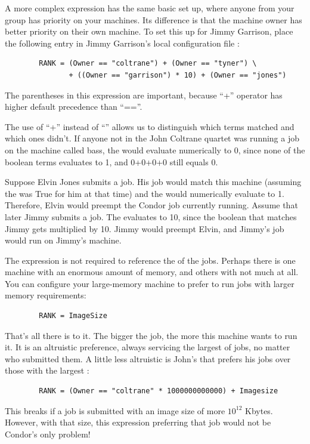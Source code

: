 A more complex  expression
has the same basic set up,
where anyone from your group has priority on your machines.
Its difference is that
the machine owner has better priority on their own machine.
To set this up for Jimmy Garrison,
place the following entry in Jimmy Garrison's local
configuration file :
\begin{verbatim}
        RANK = (Owner == "coltrane") + (Owner == "tyner") \
               + ((Owner == "garrison") * 10) + (Owner == "jones")
\end{verbatim}
\Note The parentheses in this expression are important, because ``+''
      operator has higher default precedence than ``==''.

The use of ``+'' instead of ``\Bar\Bar'' allows us to 
distinguish which terms matched and which ones didn't.
If anyone not in the John Coltrane quartet was running a job on
the machine called bass,
the  would evaluate numerically to 0, since none
of the boolean terms evaluates to 1, and 0+0+0+0 still equals 0.

Suppose Elvin Jones submits a job.
His job would match this
machine (assuming the  was True for him at that time) and
the \MacroNI{RANK} would numerically evaluate to 1.
Therefore, Elvin would preempt the Condor job currently running.
Assume that later Jimmy submits a job.
The  evaluates to 10, since the boolean that matches Jimmy
gets multiplied by 10.
Jimmy would preempt Elvin, and Jimmy's job would run on
Jimmy's machine.

The  expression is not required to reference the
 of the jobs.
Perhaps there is one machine with an enormous amount of memory,
and others with not much at all.
You can configure your
large-memory machine to prefer to run jobs with larger memory
requirements:
\begin{verbatim}
        RANK = ImageSize
\end{verbatim}

That's all there is to it.
The bigger the job, the more this machine
wants to run it.
It is an altruistic preference, always servicing
the largest of jobs, no matter who submitted them.
A little less altruistic is John's  that
prefers his jobs over those with the largest
:
\begin{verbatim}
        RANK = (Owner == "coltrane" * 1000000000000) + Imagesize
\end{verbatim}
This  breaks if a job is submitted with an image
size of more $10^{12}$ Kbytes.
However, with that size, this  expression
preferring that job would not be Condor's
only problem! 

